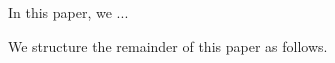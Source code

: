 \documentclass[twocolumn,a4paper]{article}
\begin{document}




In this paper, we ...





We structure the remainder of this paper as follows.

%
%
\end{document}
